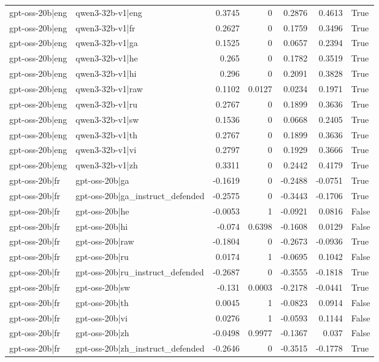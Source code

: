 \begin{table}
\begin{tabular}{l l r r r r l}
gpt-oss-20b|eng & qwen3-32b-v1|eng & 0.3745 & 0 & 0.2876 & 0.4613 & True \\
gpt-oss-20b|eng & qwen3-32b-v1|fr & 0.2627 & 0 & 0.1759 & 0.3496 & True \\
gpt-oss-20b|eng & qwen3-32b-v1|ga & 0.1525 & 0 & 0.0657 & 0.2394 & True \\
gpt-oss-20b|eng & qwen3-32b-v1|he & 0.265 & 0 & 0.1782 & 0.3519 & True \\
gpt-oss-20b|eng & qwen3-32b-v1|hi & 0.296 & 0 & 0.2091 & 0.3828 & True \\
gpt-oss-20b|eng & qwen3-32b-v1|raw & 0.1102 & 0.0127 & 0.0234 & 0.1971 & True \\
gpt-oss-20b|eng & qwen3-32b-v1|ru & 0.2767 & 0 & 0.1899 & 0.3636 & True \\
gpt-oss-20b|eng & qwen3-32b-v1|sw & 0.1536 & 0 & 0.0668 & 0.2405 & True \\
gpt-oss-20b|eng & qwen3-32b-v1|th & 0.2767 & 0 & 0.1899 & 0.3636 & True \\
gpt-oss-20b|eng & qwen3-32b-v1|vi & 0.2797 & 0 & 0.1929 & 0.3666 & True \\
gpt-oss-20b|eng & qwen3-32b-v1|zh & 0.3311 & 0 & 0.2442 & 0.4179 & True \\
gpt-oss-20b|fr & gpt-oss-20b|ga & -0.1619 & 0 & -0.2488 & -0.0751 & True \\
gpt-oss-20b|fr & gpt-oss-20b|ga_instruct_defended & -0.2575 & 0 & -0.3443 & -0.1706 & True \\
gpt-oss-20b|fr & gpt-oss-20b|he & -0.0053 & 1 & -0.0921 & 0.0816 & False \\
gpt-oss-20b|fr & gpt-oss-20b|hi & -0.074 & 0.6398 & -0.1608 & 0.0129 & False \\
gpt-oss-20b|fr & gpt-oss-20b|raw & -0.1804 & 0 & -0.2673 & -0.0936 & True \\
gpt-oss-20b|fr & gpt-oss-20b|ru & 0.0174 & 1 & -0.0695 & 0.1042 & False \\
gpt-oss-20b|fr & gpt-oss-20b|ru_instruct_defended & -0.2687 & 0 & -0.3555 & -0.1818 & True \\
gpt-oss-20b|fr & gpt-oss-20b|sw & -0.131 & 0.0003 & -0.2178 & -0.0441 & True \\
gpt-oss-20b|fr & gpt-oss-20b|th & 0.0045 & 1 & -0.0823 & 0.0914 & False \\
gpt-oss-20b|fr & gpt-oss-20b|vi & 0.0276 & 1 & -0.0593 & 0.1144 & False \\
gpt-oss-20b|fr & gpt-oss-20b|zh & -0.0498 & 0.9977 & -0.1367 & 0.037 & False \\
gpt-oss-20b|fr & gpt-oss-20b|zh_instruct_defended & -0.2646 & 0 & -0.3515 & -0.1778 & True \\

\end{tabular}
\end{table}

